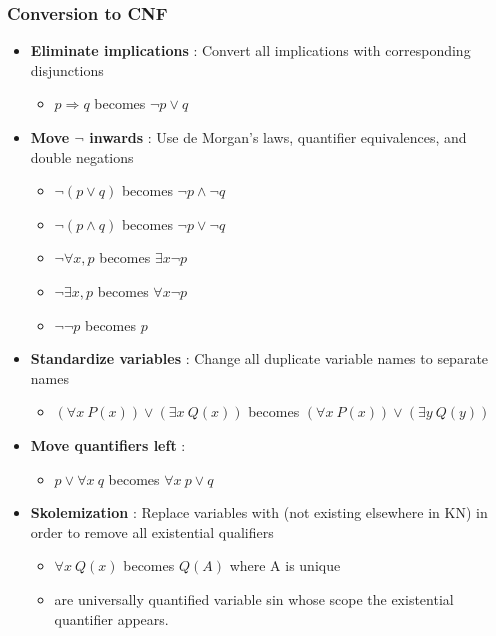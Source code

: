 \subsubsection{Conversion to CNF}

\begin{itemize}
\item \textbf{Eliminate implications} : Convert all implications with corresponding disjunctions
	\begin{itemize}
	\item[] $p \Rightarrow q$ becomes $\neg p \lor q$
	\end{itemize}
\item \textbf{Move $\neg$ inwards} : Use de Morgan’s laws, quantifier equivalences, and double negations
	\begin{itemize}
	\item[] $\neg (p \lor q)$ becomes $\neg p \land \neg q$
	\item[] $\neg (p \land q)$ becomes $\neg p \lor \neg q$
	\item[] $\neg \forall x, p$ becomes $\exists x \neg p$
	\item[] $\neg \exists x, p$ becomes $\forall x \neg p$
	\item[] $\neg \neg p$ becomes $p$
	\end{itemize}
\item \textbf{Standardize variables} : Change all duplicate variable names to separate names
	\begin{itemize}
	\item[] $(\forall x \ P(x)) \lor (\exists x \ Q(x))$ becomes $(\forall x \ P(x)) \lor (\exists y \ Q(y))$
	\end{itemize}
\item \textbf{Move quantifiers left} :
	\begin{itemize}
	\item[] $p \lor \forall x \ q$ becomes $\forall x \ p \lor q$
	\end{itemize}
\item \textbf{Skolemization} : Replace variables with  (not existing elsewhere in KN) in order to remove all existential qualifiers
	\begin{itemize}
	\item[] $\forall x \ Q(x)$ becomes $Q(A)$ where A is unique
	\item {} are universally quantified variable sin whose scope the existential quantifier appears.
	\end{itemize}

\end{itemize}
